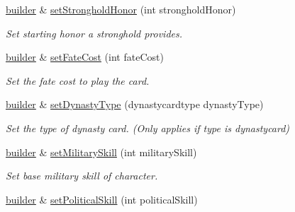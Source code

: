 \begin{DoxyCompactItemize}
\hyperlink{classl5r_1_1CardData_1_1builder}{builder} \& \hyperlink{classl5r_1_1CardData_1_1builder_a8f40ddc4707dd6ac13bc9c5354b6e980}{set\+Stronghold\+Honor} (int stronghold\+Honor)
\begin{DoxyCompactList}\small\item\em Set starting honor a stronghold provides. \end{DoxyCompactList}\item 
\mbox{\label{classl5r_1_1CardData_1_1builder_aba8210b8109408464c8b750f047f0bca}} 
\hyperlink{classl5r_1_1CardData_1_1builder}{builder} \& \hyperlink{classl5r_1_1CardData_1_1builder_aba8210b8109408464c8b750f047f0bca}{set\+Fate\+Cost} (int fate\+Cost)
\begin{DoxyCompactList}\small\item\em Set the fate cost to play the card. \end{DoxyCompactList}\item 
\mbox{\label{classl5r_1_1CardData_1_1builder_a74f15438fda1c913a5152312dca490e6}} 
\hyperlink{classl5r_1_1CardData_1_1builder}{builder} \& \hyperlink{classl5r_1_1CardData_1_1builder_a74f15438fda1c913a5152312dca490e6}{set\+Dynasty\+Type} (dynastycardtype dynasty\+Type)
\begin{DoxyCompactList}\small\item\em Set the type of dynasty card. (Only applies if type is dynastycard) \end{DoxyCompactList}\item 
\mbox{\label{classl5r_1_1CardData_1_1builder_a56562fb3a0f4dd6665251ad1d9b27a05}} 
\hyperlink{classl5r_1_1CardData_1_1builder}{builder} \& \hyperlink{classl5r_1_1CardData_1_1builder_a56562fb3a0f4dd6665251ad1d9b27a05}{set\+Military\+Skill} (int military\+Skill)
\begin{DoxyCompactList}\small\item\em Set base military skill of character. \end{DoxyCompactList}\item 
\mbox{\label{classl5r_1_1CardData_1_1builder_a7cd21584ea7f11d2accb2c636f0ec84e}} 
\hyperlink{classl5r_1_1CardData_1_1builder}{builder} \& \hyperlink{classl5r_1_1CardData_1_1builder_a7cd21584ea7f11d2accb2c636f0ec84e}{set\+Political\+Skill} (int political\+Skill)

\end{DoxyCompactItemize}
